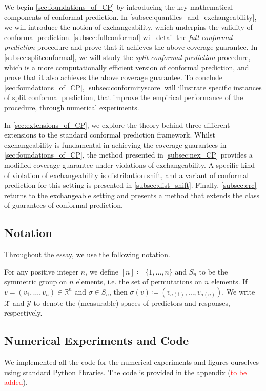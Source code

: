 \documentclass[11pt, titlepage]{article} %
\numberwithin{equation}{section}
\theoremstyle{definition}
\numberwithin{theorem}{section}
\numberwithin{lemma}{section}
\numberwithin{corollary}{section}
\numberwithin{proposition}{section}
\numberwithin{definition}{section}
\numberwithin{remark}{section}
\begin{document}
\noindent
We begin \cref{sec:foundations_of_CP} by introducing the key mathematical components of conformal prediction. In \cref{subsec:quantiles_and_exchangeability}, we will introduce the notion of exchangeability, which underpins the validity of conformal prediction. \cref{subsec:fullconformal} will detail the \textit{full conformal prediction} procedure and prove that it achieves the above coverage guarantee. In \cref{subsec:splitconformal}, we will study the \textit{split conformal prediction} procedure, which is a more computationally efficient version of conformal prediction, and prove that it also achieves the above coverage guarantee. To conclude \cref{sec:foundations_of_CP}, \cref{subsec:conformityscore} will illustrate specific instances of split conformal prediction, that improve the empirical performance of the procedure, through numerical experiments. \vskip5pt

\noindent
In \cref{sec:extensions_of_CP}, we explore the theory behind three different extensions to the standard conformal prediction framework. Whilst exchangeability is fundamental in achieving the coverage guarantees in \cref{sec:foundations_of_CP}, the method presented in \cref{subsec:nex_CP} provides a modified coverage guarantee under violations of exchangeability. A specific kind of violation of exchangeability is distribution shift, and a variant of conformal prediction for this setting is presented in \cref{subsec:dist_shift}. Finally, \cref{subsec:crc} returns to the exchangeable setting and presents a method that extends the class of guarantees of conformal prediction.

\subsection{Notation}
\label{subsec:notation}

Throughout the essay, we use the following notation.  \vskip5pt

\noindent
For any positive integer \(n\), we define \([n] \coloneqq \{1, \ldots, n\}\) and \(S_n\) to be the symmetric group on \(n\) elements, i.e. the set of permutations on \(n\) elements. If \(v = (v_1, \ldots, v_n) \in \mathbb{R}^n\) and \(\sigma \in S_n\), then \(\sigma(v) \coloneqq (v_{\sigma(1)}, \ldots, v_{\sigma(n)}).\) We write \(\mathcal{X}\) and \(\mathcal{Y}\) to denote the (measurable) spaces of predictors and responses, respectively.

\subsection{Numerical Experiments and Code}
We implemented all the code for the numerical experiments and figures ourselves using standard Python libraries. The code is provided in the appendix (\textcolor{red}{to be added}).
\end{document}
